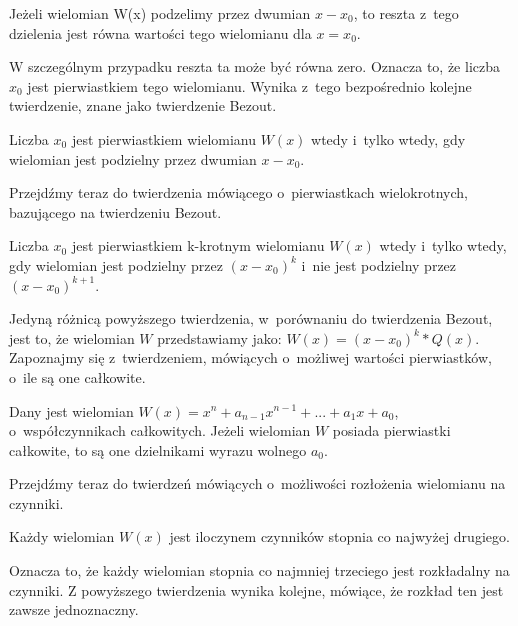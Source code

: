 \begin{theorem}
	$ $\\
	Jeżeli wielomian W(x) podzelimy przez dwumian $x - x_0$, to reszta z~tego dzielenia jest równa wartości tego wielomianu dla $x = x_0$.
\end{theorem}

W szczególnym przypadku reszta ta może być równa zero. Oznacza to, że liczba $x_0$ jest pierwiastkiem tego wielomianu. Wynika z~tego bezpośrednio kolejne twierdzenie, znane jako twierdzenie Bezout.

\begin{theorem}[Bezout]
	$ $\\
	Liczba $x_0$ jest pierwiastkiem wielomianu $W(x)$ wtedy i~tylko wtedy, gdy wielomian jest podzielny przez dwumian $x - x_0$.
\end{theorem}

Przejdźmy teraz do twierdzenia mówiącego o~pierwiastkach wielokrotnych, bazującego na twierdzeniu Bezout.

\begin{theorem}
	$ $\\
	Liczba $x_0$ jest pierwiastkiem k-krotnym wielomianu $W(x)$ wtedy i~tylko wtedy, gdy wielomian jest podzielny przez $(x - x_0)^k$ i~nie jest podzielny przez $(x - x_0)^{k+1}$.
\end{theorem}

Jedyną różnicą powyższego twierdzenia, w~porównaniu do twierdzenia Bezout, jest to, że wielomian $W$ przedstawiamy jako: $W(x) = (x-x_0)^k * Q(x)$. Zapoznajmy się z~twierdzeniem, mówiących o~możliwej wartości pierwiastków, o~ile są one całkowite.

\begin{theorem}
	$ $\\
	Dany jest wielomian $W(x) = x^n + a_{n-1}x^{n-1} + ... + a_1x + a_0$, o~współczynnikach całkowitych. Jeżeli wielomian $W$ posiada pierwiastki całkowite, to są one dzielnikami wyrazu wolnego $a_0$.
\end{theorem}

Przejdźmy teraz do twierdzeń mówiących o~możliwości rozłożenia wielomianu na czynniki.

\begin{theorem}
	$ $\\
	Każdy wielomian $W(x)$ jest iloczynem czynników stopnia co najwyżej drugiego.
\end{theorem}

Oznacza to, że każdy wielomian stopnia co najmniej trzeciego jest rozkładalny na czynniki. Z powyższego twierdzenia wynika kolejne, mówiące, że rozkład ten jest zawsze jednoznaczny.

